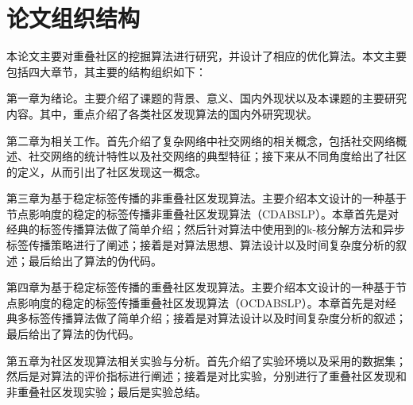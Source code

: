 \section{论文组织结构}

本论文主要对重叠社区的挖掘算法进行研究，并设计了相应的优化算法。本文主要包括四大章节，其主要的结构组织如下：

第一章为绪论。主要介绍了课题的背景、意义、国内外现状以及本课题的主要研究内容。其中，重点介绍了各类社区发现算法的国内外研究现状。

第二章为相关工作。首先介绍了复杂网络中社交网络的相关概念，包括社交网络概述、社交网络的统计特性以及社交网络的典型特征；接下来从不同角度给出了社区的定义，从而引出了社区发现这一概念。

第三章为基于稳定标签传播的非重叠社区发现算法。主要介绍本文设计的一种基于节点影响度的稳定的标签传播非重叠社区发现算法（CDABSLP）。本章首先是对经典的标签传播算法做了简单介绍；然后针对算法中使用到的k-核分解方法和异步标签传播策略进行了阐述；接着是对算法思想、算法设计以及时间复杂度分析的叙述；最后给出了算法的伪代码。

第四章为基于稳定标签传播的重叠社区发现算法。主要介绍本文设计的一种基于节点影响度的稳定的标签传播重叠社区发现算法（OCDABSLP）。本章首先是对经典多标签传播算法做了简单介绍；接着是对算法设计以及时间复杂度分析的叙述；最后给出了算法的伪代码。

第五章为社区发现算法相关实验与分析。首先介绍了实验环境以及采用的数据集；然后是对算法的评价指标进行阐述；接着是对比实验，分别进行了重叠社区发现和非重叠社区发现实验；最后是实验总结。
